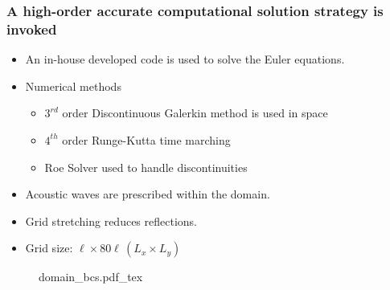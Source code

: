 \begin{frame} \frametitle{A high-order accurate computational solution strategy is invoked}
  \begin{minipage}{0.62\textwidth}
    \begin{itemize}
    \item An in-house developed code is used to solve the Euler equations.
    \item Numerical methods
      \begin{itemize}
      \item $3^{rd}$ order Discontinuous Galerkin method is used in space
      \item $4^{th}$ order Runge-Kutta time marching
      \item Roe Solver used to handle discontinuities
      \end{itemize}
    \item Acoustic waves are prescribed within the domain.
    \item Grid stretching reduces reflections.
    \item Grid size: $\ell \times 80\ell \, (L_x \times L_y)$
    \end{itemize}
  \end{minipage}
  \hfill%
  \begin{minipage}{0.34\textwidth}
    \begin{figure}
      \centering
      \def\svgwidth{\textwidth}
      {\footnotesize
        {domain_bcs.pdf_tex}%
      }
    \end{figure}
  \end{minipage}
\end{frame}
